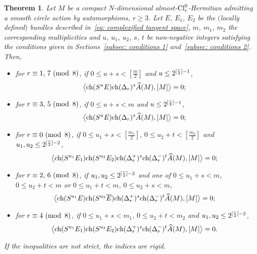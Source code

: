 \documentclass[pdftex]{sigma}
\newcommand{\A}{\mbox{$\widehat A$}}
\newcommand{\sym}{S}
\newcommand{\ch}{\mbox{\rm ch}}
\numberwithin{equation}{section}
\newtheorem{Theorem}{Theorem}[section]
\begin{document}
\begin{Theorem}\label{theo: vanishing 2} Let $M$ be a compact $N$-dimensional almost-${\rm Cl}_r^0$-Hermitian admitting a smooth circle action by automorphisms, $r\geq 3$. Let $E$, $E_1$, $E_2$ be the $($locally defined$)$ bundles described in~\eqref{eq: complexified tangent space}, $m$, $m_1$, $m_2$ the corresponding multiplicities and $u$, $u_1$, $u_2$, $s$, $t$ be non-negative integers satisfying the conditions given in Sections~{\rm \ref{subsec: conditions 1}} and~{\rm \ref{subsec: conditions 2}}. Then,
\begin{itemize}\itemsep=0pt
\item for $r\equiv 1,\, 7 \,\,({\rm mod\,\,\,} 8)$, if $0\leq u+s<[\frac{m}{2}]$ and $u\leq 2^{[{r\over 2}]-1}$,
 \begin{gather*}\big\langle \ch(\sym^u E)\ch(\Delta_r)^s\A(M),[M]\big\rangle =0;\end{gather*}

\item for $r\equiv 3,\, 5 \,\,({\rm mod\,\,\,} 8)$, if $0\leq u+s<m$ and $u\leq 2^{[{r\over 2}]-1}$,
 \begin{gather*}\big\langle \ch(\sym^u E)\ch(\Delta_r)^s\A(M),[M]\big\rangle =0;\end{gather*}

\item for $r\equiv 0 \,\,({\rm mod\,\,\,} 8)$, if $0\leq u_1+s<[\frac{m_1}{2}]$, $0\leq u_2+t<[\frac{m_2}{2}]$ and $u_1,u_2\leq 2^{[{r\over 2}]-2}$,
 \begin{gather*}\big\langle \ch(\sym^{u_1} E_1)\ch(\sym^{u_2} E_2)\ch(\Delta_r^+)^{s}\ch(\Delta_r^-)^{t}\A(M),[M]\big\rangle =0;\end{gather*}

\item for $r\equiv 2,\, 6 \,\,({\rm mod\,\,\,} 8)$, if $u_1,u_2\leq 2^{[{r\over 2}]-2}$ and one of $0\leq u_1+s<m$, $0 \leq u_2+t <m$ or $0\leq u_1+t<m$, $0 \leq u_2+s <m$,
 \begin{gather*}\big\langle \ch(\sym^{u_1} E)\ch(\sym^{u_2} \overline{E})\ch(\Delta_r^+)^{s}\ch(\Delta_r^-)^{t}\A(M),[M]\big\rangle =0;\end{gather*}

\item for $r\equiv 4 \,\,({\rm mod\,\,\,} 8)$, if $0\leq u_1+s<m_1$, $0\leq u_2+t<m_2$ and $u_1,u_2\leq 2^{[{r\over 2}]-2}$,
 \begin{gather*}\big\langle \ch(\sym^{u_1} E_1)\ch(\sym^{u_2} E_2)\ch(\Delta_r^+)^{s}\ch(\Delta_r^-)^{t}\A(M),[M]\big\rangle =0.\end{gather*}
\end{itemize}
If the inequalities are not strict, the indices are rigid.
\end{Theorem}
\end{document}
